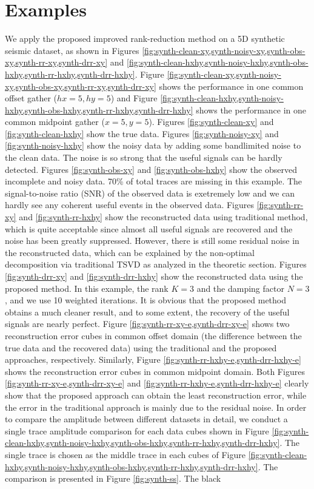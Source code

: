 \section{Examples}
We apply the proposed improved rank-reduction method on a 5D synthetic seismic dataset, as shown in Figures \ref{fig:synth-clean-xy,synth-noisy-xy,synth-obs-xy,synth-rr-xy,synth-drr-xy} and \ref{fig:synth-clean-hxhy,synth-noisy-hxhy,synth-obs-hxhy,synth-rr-hxhy,synth-drr-hxhy}. Figure \ref{fig:synth-clean-xy,synth-noisy-xy,synth-obs-xy,synth-rr-xy,synth-drr-xy} shows the performance in one common offset gather ($hx=5,hy=5$) and Figure \ref{fig:synth-clean-hxhy,synth-noisy-hxhy,synth-obs-hxhy,synth-rr-hxhy,synth-drr-hxhy} shows the performance in one common midpoint gather ($x=5,y=5$). Figures \ref{fig:synth-clean-xy} and \ref{fig:synth-clean-hxhy} show the true data. Figures \ref{fig:synth-noisy-xy} and \ref{fig:synth-noisy-hxhy} show the noisy data by adding some bandlimited noise to the clean data. The noise is so strong that the useful signals can be hardly detected. Figures \ref{fig:synth-obs-xy} and \ref{fig:synth-obs-hxhy} show the observed incomplete and noisy data. 70\% of total traces are missing in this example. The signal-to-noise ratio (SNR) of the observed data is exetremely low and we can hardly see any coherent useful events in the observed data. Figures \ref{fig:synth-rr-xy} and \ref{fig:synth-rr-hxhy} show the reconstructed data using traditional method, which is quite acceptable since almost all useful signals are recovered and the noise has been greatly suppressed. However, there is still some residual noise in the reconstructed data, which can be explained by the non-optimal decomposition via traditional TSVD as analyzed in the theoretic section. Figures \ref{fig:synth-drr-xy} and \ref{fig:synth-drr-hxhy} show the reconstructed data using the proposed method. In this example, the rank $K=3$ and the damping factor $N=3$, and we use 10 weighted  iterations. It is obvious that the proposed method obtains a much cleaner result, and to some extent, the recovery of the useful signals are nearly perfect.  Figure \ref{fig:synth-rr-xy-e,synth-drr-xy-e} shows two reconstruction error cubes in common offset domain (the difference between the true data and the recovered data) using the traditional and the proposed approaches, respectively. Similarly, Figure \ref{fig:synth-rr-hxhy-e,synth-drr-hxhy-e} shows the reconstruction error cubes in common midpoint domain. Both Figures \ref{fig:synth-rr-xy-e,synth-drr-xy-e} and \ref{fig:synth-rr-hxhy-e,synth-drr-hxhy-e} clearly show that the proposed approach can obtain the least reconstruction error, while the error in the traditional approach is mainly due to the residual noise. In order to compare the amplitude between different datasets in detail, we conduct a single trace amplitude comparison for each data cubes shown in Figure \ref{fig:synth-clean-hxhy,synth-noisy-hxhy,synth-obs-hxhy,synth-rr-hxhy,synth-drr-hxhy}. The single trace is chosen as the middle trace in each cubes of Figure \ref{fig:synth-clean-hxhy,synth-noisy-hxhy,synth-obs-hxhy,synth-rr-hxhy,synth-drr-hxhy}. The comparison is presented in Figure \ref{fig:synth-ss}. The black
